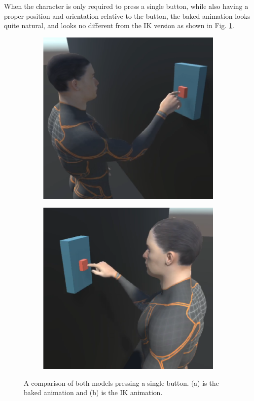 When the character is only required to press a single button, while also having
a proper position and orientation relative to the button, the baked animation
looks quite natural, and looks no different from the IK version as shown in Fig.
\ref{fig:h_single}.

\begin{figure}[h!]
    \centering
    \captionsetup{justification=centering}
    \begin{subfigure}{0.4\textwidth}
        \includegraphics[width=\linewidth]{grafika/h_b_single.eps}
    \end{subfigure}
    \begin{subfigure}{0.4\textwidth}
        \includegraphics[width=\linewidth]{grafika/h_ik_single.eps}
    \end{subfigure}
    \caption{A comparison of both models pressing a single button. (a) is the
    baked animation and (b) is the IK animation.}
    \label{fig:h_single}
\end{figure}

